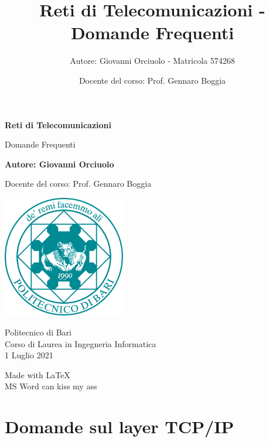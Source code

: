 \documentclass[12pt]{article}
\title{Reti di Telecomunicazioni - Domande Frequenti}
\author{Autore: Giovanni Orciuolo - Matricola 574268}
\date{Docente del corso: Prof. Gennaro Boggia}
\begin{document}
\graphicspath{ {./images/} }

\begin{titlepage}
    \begin{center}
        \vspace*{1cm}
            
        \Huge
        \textbf{Reti di Telecomunicazioni}
            
        \vspace{0.5cm}
        \LARGE
        Domande Frequenti
            
        \vspace{1.5cm}
            
        \textbf{Autore: Giovanni Orciuolo}
            
        \vfill
            
        Docente del corso: Prof. Gennaro Boggia
            
        \vspace{0.8cm}
            
        \includegraphics[width=0.4\textwidth]{logo_poliba}
        
        \vspace{0.8cm}
        \Large
        Politecnico di Bari\\
        Corso di Laurea in Ingegneria Informatica\\
        1 Luglio 2021
        
        \vspace{1cm}
        Made with \LaTeX\\
        MS Word can kiss my ass
    \end{center}
\end{titlepage}

\newpage
\tableofcontents
\newpage

\section{Domande sul layer TCP/IP}
\end{document}
